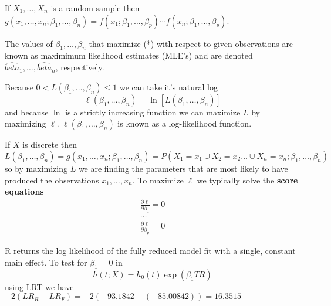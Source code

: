 \documentclass{article}
\begin{document}
If $X_1,\ldots,X_n$ is a random sample then $g(x_1,\ldots,x_n;\beta_1,\ldots,\beta_n) = f(x_1;\beta_1,\ldots,\beta_p) \cdots  f(x_n;\beta_1,\ldots,\beta_p)$.

The values of $\beta_1,\ldots,\beta_n$ that maximize (*) with respect to given observations are known as maximimum likelihood estimates (MLE's) and are denoted $\hat{beta}_1,\ldots,\hat{beta}_n$, respectively.

Because $0<L(\beta_1,\ldots,\beta_n) \leq 1$ we can take it's natural log
\[
\ell(\beta_1,\ldots,\beta_n) = \ln[L(\beta_1,\ldots,\beta_n)]
\]
and because $\ln$ is a strictly increasing function we can maximize $L$ by maximizing $\ell$. $\ell(\beta_1,\ldots,\beta_n)$ is known as a log-likelihood function.

If $X$ is discrete then
\[
L(\beta_1,\ldots,\beta_n) = g(x_1,\ldots,x_n;\beta_1,\ldots,\beta_n) = P(X_1=x_1 \cup X_2=x_2 \ldots \cup X_n = x_n;\beta_1,\ldots,\beta_n)
\]
so by maximizing $L$ we are finding the parameters that are most likely to have produced the observations $x_1,\ldots,x_n$.
To maximize $\ell$ we typically solve the \textbf{score equations}
\begin{align*}
\frac{\partial \ell}{\partial \beta_1}=0 \\
\ldots \\
\frac{\partial \ell}{\partial \beta_p}=0
\end{align*}

R returns the log likelihood of the fully reduced model fit with a single, constant main effect.
To test for $\beta_1=0$ in
\[ h(t;X) = h_0(t)\exp(\beta_1 TR)
\]
using LRT we have $-2(LR_R-LR_F)=-2(-93.1842-(-85.00842)) = 16.3515$ 
\end{document}
